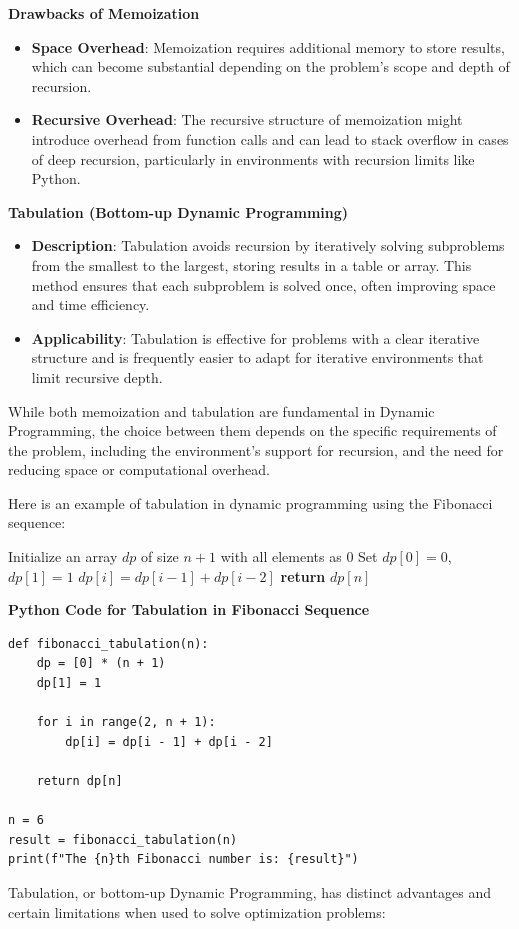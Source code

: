 \documentclass[12pt]{book} %
\begin{document}
\textbf{Drawbacks of Memoization}
\begin{itemize}
    \item \textbf{Space Overhead}: Memoization requires additional memory to store results, which can become substantial depending on the problem’s scope and depth of recursion.
    \item \textbf{Recursive Overhead}: The recursive structure of memoization might introduce overhead from function calls and can lead to stack overflow in cases of deep recursion, particularly in environments with recursion limits like Python.
\end{itemize}

\textbf{Tabulation (Bottom-up Dynamic Programming)}
\begin{itemize}
    \item \textbf{Description}: Tabulation avoids recursion by iteratively solving subproblems from the smallest to the largest, storing results in a table or array. This method ensures that each subproblem is solved once, often improving space and time efficiency.
    \item \textbf{Applicability}: Tabulation is effective for problems with a clear iterative structure and is frequently easier to adapt for iterative environments that limit recursive depth.
\end{itemize}

While both memoization and tabulation are fundamental in Dynamic Programming, the choice between them depends on the specific requirements of the problem, including the environment's support for recursion, and the need for reducing space or computational overhead.


Here is an example of tabulation in dynamic programming using the Fibonacci sequence:
\FloatBarrier
\begin{algorithm}
\caption{Tabulation for Fibonacci Sequence}
\begin{algorithmic}
\State Initialize an array $dp$ of size $n+1$ with all elements as 0
\State Set $dp[0] = 0$, $dp[1] = 1$
    \State $dp[i] = dp[i-1] + dp[i-2]$
\EndFor
\State \textbf{return} $dp[n]$
\end{algorithmic}
\end{algorithm}
\FloatBarrier
\textbf{Python Code for Tabulation in Fibonacci Sequence}
\FloatBarrier
\begin{lstlisting}
def fibonacci_tabulation(n):
    dp = [0] * (n + 1)
    dp[1] = 1
    
    for i in range(2, n + 1):
        dp[i] = dp[i - 1] + dp[i - 2]
    
    return dp[n]

n = 6
result = fibonacci_tabulation(n)
print(f"The {n}th Fibonacci number is: {result}")
\end{lstlisting}
\FloatBarrier
Tabulation, or bottom-up Dynamic Programming, has distinct advantages and certain limitations when used to solve optimization problems:
\end{document}
